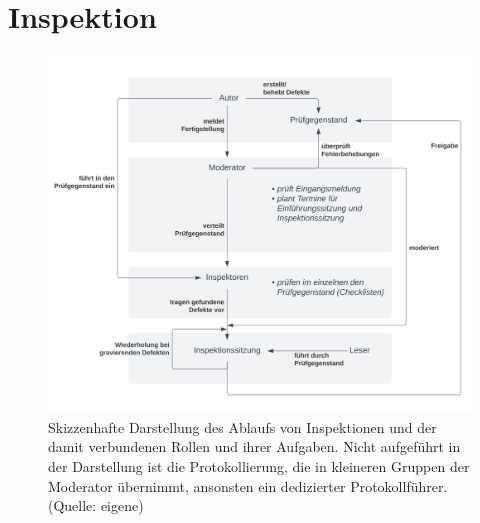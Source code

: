 \section{Inspektion}


\begin{figure}
    \centering
    \includegraphics[scale=0.4]{part four/Manuelle Verfahren/img/inspektion}
    \caption{Skizzenhafte Darstellung des Ablaufs von Inspektionen und der damit verbundenen Rollen und ihrer Aufgaben. Nicht aufgeführt in der Darstellung ist die Protokollierung, die in kleineren Gruppen der Moderator übernimmt, ansonsten ein dedizierter Protokollführer. (Quelle: eigene)}
    \label{fig:inspektion-cc}
\end{figure}

